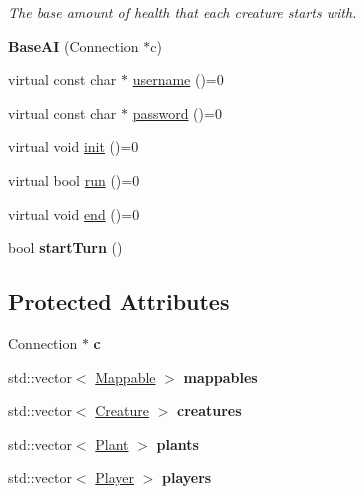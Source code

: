 \begin{DoxyCompactItemize}
\begin{DoxyCompactList}\small\item\em \-The base amount of health that each creature starts with. \end{DoxyCompactList}\item 
\hypertarget{classBaseAI_a3f2806936e6e65d76218e04b057e05f4}{{\bfseries \-Base\-A\-I} (\-Connection $\ast$c)}\label{classBaseAI_a3f2806936e6e65d76218e04b057e05f4}

\item 
virtual const char $\ast$ \hyperlink{classBaseAI_aef082fbf306fec04515ed5ed3b1ba582}{username} ()=0
\item 
virtual const char $\ast$ \hyperlink{classBaseAI_a9251e20447917cda64ad1487b903456f}{password} ()=0
\item 
virtual void \hyperlink{classBaseAI_a90ce8becd6f2e32c2cc32d41145e88df}{init} ()=0
\item 
virtual bool \hyperlink{classBaseAI_ad60148e7e9e450ce47432b07b4db1ed6}{run} ()=0
\item 
virtual void \hyperlink{classBaseAI_a60c8246a859ba2dba84b70239bc129bc}{end} ()=0
\item 
\hypertarget{classBaseAI_ac6303df0fece47e29b77dd0aa0aa4fe8}{bool {\bfseries start\-Turn} ()}\label{classBaseAI_ac6303df0fece47e29b77dd0aa0aa4fe8}

\end{DoxyCompactItemize}
\subsection*{\-Protected \-Attributes}
\begin{DoxyCompactItemize}
\item 
\hypertarget{classBaseAI_a40585cc4b7c885978fffa3b1a23cb7ce}{\-Connection $\ast$ {\bfseries c}}\label{classBaseAI_a40585cc4b7c885978fffa3b1a23cb7ce}

\item 
\hypertarget{classBaseAI_a3b8aa65327b20a507f3e4bc81b902056}{std\-::vector$<$ \hyperlink{classMappable}{\-Mappable} $>$ {\bfseries mappables}}\label{classBaseAI_a3b8aa65327b20a507f3e4bc81b902056}

\item 
\hypertarget{classBaseAI_adef7ed8df13e70237d7d50bb1f6977d9}{std\-::vector$<$ \hyperlink{classCreature}{\-Creature} $>$ {\bfseries creatures}}\label{classBaseAI_adef7ed8df13e70237d7d50bb1f6977d9}

\item 
\hypertarget{classBaseAI_a63fc63cfe667448d5c834871f324c110}{std\-::vector$<$ \hyperlink{classPlant}{\-Plant} $>$ {\bfseries plants}}\label{classBaseAI_a63fc63cfe667448d5c834871f324c110}

\item 
\hypertarget{classBaseAI_a6b181b9b964fa5ed999264f935b8b107}{std\-::vector$<$ \hyperlink{classPlayer}{\-Player} $>$ {\bfseries players}}\label{classBaseAI_a6b181b9b964fa5ed999264f935b8b107}

\end{DoxyCompactItemize}


